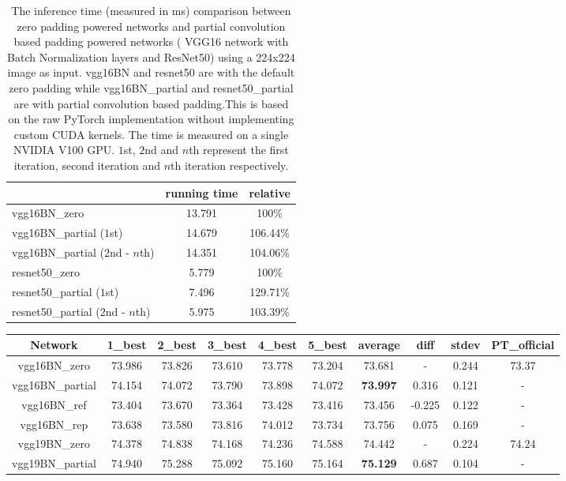 \documentclass[10pt,twocolumn,letterpaper]{article}
\begin{document}
\begin{table}[h]
    \centering
    \begin{tabular}{l|c|c}
          & running time & relative  \\
        \hline
        vgg16BN\_zero & 13.791 & 100\% \\
        \hline
        vgg16BN\_partial ($1$st) & 14.679 & 106.44\% \\
        vgg16BN\_partial ($2$nd - $n$th)  & 14.351 & 104.06\% \\
        \hline
        \hline
        resnet50\_zero & 5.779 & 100\% \\
        \hline
        resnet50\_partial ($1$st) & 7.496 & 129.71\% \\
        resnet50\_partial ($2$nd - $n$th) & 5.975 & 103.39\% \\
        \hline
    \end{tabular}
    \caption{The inference time (measured in ms) comparison between zero padding powered networks and partial convolution based padding powered networks ( VGG16 network with Batch Normalization layers and ResNet50) using a 224x224 image as input. vgg16BN and resnet50 are with the default zero padding while vgg16BN\_partial and resnet50\_partial are with partial convolution based padding.This is based on the raw PyTorch implementation without implementing custom CUDA kernels. The time is measured on a single NVIDIA V100 GPU. $1$st, $2$nd and $n$th represent the first iteration, second iteration and $n$th iteration respectively.}
    \label{tab:running_time}
\end{table}\begin{table*}%
    \centering
    \begin{tabular}{c|ccccc|ccc||c}
Network&1\_best&2\_best&3\_best&4\_best&5\_best&average&diff&stdev & PT\_official \\
\hline
vgg16BN\_zero&73.986&73.826&73.610&73.778&73.204&73.681& - &0.244 & 73.37 \\
vgg16BN\_partial&74.154&74.072&73.790&73.898&74.072&\textbf{73.997}&0.316&0.121 & - \\
vgg16BN\_ref&73.404&73.670&73.364& 73.428 & 73.416 &73.456&-0.225&0.122& -\\
vgg16BN\_rep&73.638&73.580&73.816&74.012 &73.734&73.756 &0.075&0.169& - \\
\hline
vgg19BN\_zero&74.378&74.838&74.168&74.236&74.588&74.442& - &0.224 & 74.24 \\
vgg19BN\_partial&74.940&75.288&75.092&75.160&75.164&\textbf{75.129}&0.687&0.104 & - \\

\end{tabular}
\end{table*}
\end{document}
